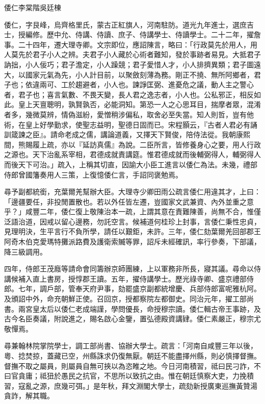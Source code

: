 
\begin{pinyinscope}
倭仁李棠階吳廷棟

倭仁，字艮峰，烏齊格里氏，蒙古正紅旗人，河南駐防。道光九年進士，選庶吉士，授編修。歷中允、侍講、侍讀、庶子、侍講學士、侍讀學士。二十二年，擢詹事。二十四年，遷大理寺卿。文宗即位，應詔陳言，略曰：「行政莫先於用人，用人莫先於君子小人之辨。夫君子小人藏於心術者難知，發於事跡者易見。大抵君子訥拙，小人佞巧；君子澹定，小人躁競；君子愛惜人才，小人排擠異類；君子圖遠大，以國家元氣為先，小人計目前，以聚斂刻薄為務。剛正不撓、無所阿鄉者，君子也；依違兩可、工於趨避者，小人也。諫諍匡弼、進憂危之議，動人主之警心者，君子也；喜言氣數、不畏天變，長人君之逸志者，小人也。公私邪正，相反如此。皇上天亶聰明，孰賢孰否，必能洞知。第恐一人之心思耳目，揣摩者眾，混淆者多，幾微莫辨，情偽滋紛，愛憎稍涉偏私，取舍必至失當。知人則哲，豈有他術，在皇上好學勤求，使聖志益明，聖德日固而已。宋程顥云，『古者人君必有誦訓箴諫之臣』。請命老成之儒，講論道義，又擇天下賢俊，陪侍法從。我朝康熙間，熊賜履上疏，亦以『延訪真儒』為說。二臣所言，皆修養身心之要，用人行政之源也。天下治亂系宰相，君德成就責講筵。惟君德成就而後輔弼得人，輔弼得人而後天下可治。」疏入，上稱其切直，因諭大小臣工進言以倭仁為法。未幾，禮部侍郎曾國籓奏用人三策，上復憶倭仁言，手詔同褒勉焉。

尋予副都統銜，充葉爾羌幫辦大臣。大理寺少卿田雨公疏言倭仁用違其才，上曰：「邊疆要任，非投閒置散也。若以外任皆左遷，豈國家文武兼資、內外並重之意乎？」咸豐二年，倭仁復上敬陳治本一疏，上謂其意在責難陳善，尚無不合，惟僅泛語治道，因戒以留心邊務，勿託空言。候補道何桂珍上封事，言倭仁秉性忠貞，見理明決，生平言行不負所學，請任以艱鉅，未許。三年，倭仁劾葉爾羌回部郡王阿奇木伯克愛瑪特攤派路費及護衛索贓等罪，詔斥未經確訊，率行參奏，下部議，降三級調用。

四年，侍郎王茂廕等請命會同籌辦京師團練，上以軍務非所長，寢其議。尋命以侍講候補入直上書房，授惇郡王讀。五年，擢侍講學士。歷光祿寺卿、盛京禮部侍郎。七年，調戶部，管奉天府尹事，劾罷盛京副都統增慶、兵部侍郎富呢雅杭阿。及頒詔中外，命充朝鮮正使。召回京，授都察院左都御史。同治元年，擢工部尚書。兩宮皇太后以倭仁老成端謹，學問優長，命授穆宗讀。倭仁輯古帝王事跡，及古今名臣奏議，附說進之，賜名啟心金鑒，置弘德殿資講肄。倭仁素嚴正，穆宗尤敬憚焉。

尋兼翰林院掌院學士，調工部尚書、協辦大學士。疏言：「河南自咸豐三年以後，粵、捻焚掠，蓋藏已空，州縣誅求仍復無厭。朝廷不能盡擇州縣，則必慎擇督撫。督撫不取之屬員，則屬員自無可挾以為恣睢之地。今日河南積習，祗曰民刁詐，不曰官貪庸；祗狃於愚民之抗官，不思所以致抗之由。惟在朝廷慎察大吏，力挽積習，寇亂之源，庶幾可弭。」是年秋，拜文淵閣大學士，疏劾新授廣東巡撫黃贊湯貪詐，解其職。


\end{pinyinscope}
